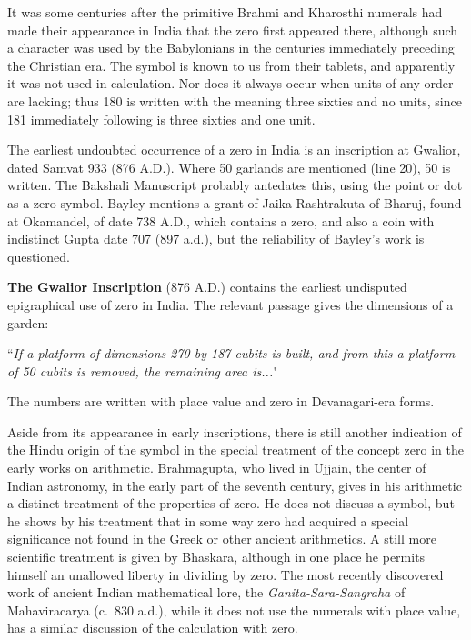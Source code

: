 \documentclass[11pt,a4paper]{article}
\newenvironment{enhancednote}{%
  \begin{tcolorbox}[colback=enhancedbg,colframe=notecolor,boxrule=1pt,
    left=10pt,right=10pt,top=8pt,bottom=8pt,
    title={\textbf{Enhanced Edition Note}},fonttitle=\bfseries\color{notecolor}]
}{\end{tcolorbox}}
\begin{document}
It was some centuries after the primitive Brahmi and Kharosthi numerals had made their appearance in India that the zero first appeared there, although such a character was used by the Babylonians in the centuries immediately preceding the Christian era. The symbol is known to us from their tablets, and apparently it was not used in calculation. Nor does it always occur when units of any order are lacking; thus 180 is written with the meaning three sixties and no units, since 181 immediately following is three sixties and one unit.

The earliest undoubted occurrence of a zero in India is an inscription at Gwalior, dated Samvat 933 (876 A.D.). Where 50 garlands are mentioned (line 20), 50 is written. The Bakshali Manuscript probably antedates this, using the point or dot as a zero symbol. Bayley mentions a grant of Jaika Rashtrakuta of Bharuj, found at Okamandel, of date 738 A.D., which contains a zero, and also a coin with indistinct Gupta date 707 (897 a.d.), but the reliability of Bayley's work is questioned.

\begin{enhancednote}
\textbf{The Gwalior Inscription} (876 A.D.) contains the earliest undisputed epigraphical use of zero in India. The relevant passage gives the dimensions of a garden:

``\textit{If a platform of dimensions 270 by 187 cubits is built, and from this a platform of 50 cubits is removed, the remaining area is...}"

The numbers are written with place value and zero in Devanagari-era forms.
\end{enhancednote}

Aside from its appearance in early inscriptions, there is still another indication of the Hindu origin of the symbol in the special treatment of the concept zero in the early works on arithmetic. Brahmagupta, who lived in Ujjain, the center of Indian astronomy, in the early part of the seventh century, gives in his arithmetic a distinct treatment of the properties of zero. He does not discuss a symbol, but he shows by his treatment that in some way zero had acquired a special significance not found in the Greek or other ancient arithmetics. A still more scientific treatment is given by Bhaskara, although in one place he permits himself an unallowed liberty in dividing by zero. The most recently discovered work of ancient Indian mathematical lore, the \textit{Ganita-Sara-Sangraha} of Mahaviracarya (c.~830 a.d.), while it does not use the numerals with place value, has a similar discussion of the calculation with zero.
\end{document}

